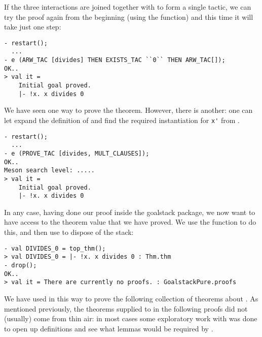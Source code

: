     If the three interactions are joined together with  to
    form a single tactic, we can try the proof again from the
    beginning (using the  function) and this time it will
    take just one step:
\begin{session}\begin{verbatim}
- restart();
  ...
- e (ARW_TAC [divides] THEN EXISTS_TAC ``0`` THEN ARW_TAC[]);
OK..
> val it =
    Initial goal proved.
    |- !x. x divides 0
\end{verbatim}\end{session}
We have seen one way to prove the theorem. However, there is another:
one can let  expand the definition of  and
find the required instantiation for \verb+x'+ from .
\begin{session}\begin{verbatim}
- restart();
  ...
- e (PROVE_TAC [divides, MULT_CLAUSES]);
OK..
Meson search level: .....
> val it =
    Initial goal proved.
    |- !x. x divides 0
\end{verbatim}\end{session}
    In any case, having done our proof inside the goalstack package,
    we now want to have access to the theorem value that we have
    proved.  We use the  function to do this, and then
    use  to dispose of the stack:
\begin{session}\begin{verbatim}
- val DIVIDES_0 = top_thm();
> val DIVIDES_0 = |- !x. x divides 0 : Thm.thm
- drop();
OK..
> val it = There are currently no proofs. : GoalstackPure.proofs
\end{verbatim}\end{session}

    We have used  in this way to prove the following
    collection of theorems about . As mentioned
    previously, the theorems supplied to  in the
    following proofs did not (usually) come from thin air: in most
    cases some exploratory work with  was done to open up
    definitions and see what lemmas would be required by
    .

